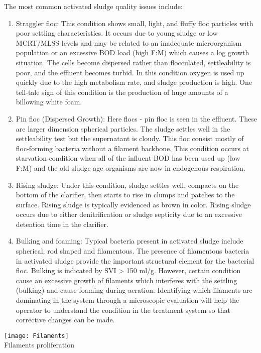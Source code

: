 The most common activated sludge quality issues include:
\begin{enumerate}[1.]
\item Straggler floc:  This condition shows small, light, and fluffy floc particles with poor settling characteristics. It occurs due to young sludge or low MCRT/MLSS levels and may be related to an inadequate microorganism population or an excessive BOD load (high F:M) which causes a log growth situation. The cells become dispersed rather than flocculated, settleability is poor, and the effluent becomes turbid. In this condition oxygen is used up quickly due to the high metabolism rate, and sludge production is high. One tell-tale sign of this condition is the production of huge amounts of a billowing white foam.

\item Pin floc (Dispersed Growth):  Here flocs - pin floc is seen in the effluent. These are larger dimension spherical particles.  The sludge settles well in the settleability test but the supernatant is cloudy. This floc consist mostly of floc-forming bacteria without a filament backbone.  This condition occurs at starvation condition when all of the influent BOD has been used up (low F:M) and the old sludge age organisms are now in endogenous respiration.

\item Rising sludge: Under this condition, sludge settles well, compacts on the bottom of the clarifier, then starts to rise in clumps and patches to the surface.  Rising sludge is typically evidenced as brown in color.  Rising sludge occurs due to either denitrification or sludge septicity due to an excessive detention time in the clarifier.  

\item Bulking and foaming:  Typical bacteria present in activated sludge include spherical, rod shaped and filamentous.  The presence of filamentous bacteria in activated sludge provide the important structural element for the bacterial floc.  Bulking is indicated by SVI > 150 ml/g. However, certain condition cause an excessive growth of filaments which interferes with the settling (bulking) and cause foaming during aeration.   Identifying which filaments are dominating in the system through a microscopic evaluation will help the operator to understand the condition in the treatment system so that corrective changes can be made.
\end{enumerate}
\begin{center}
\texttt{[image: Filaments]}\\
Filaments proliferation
\end{center}


